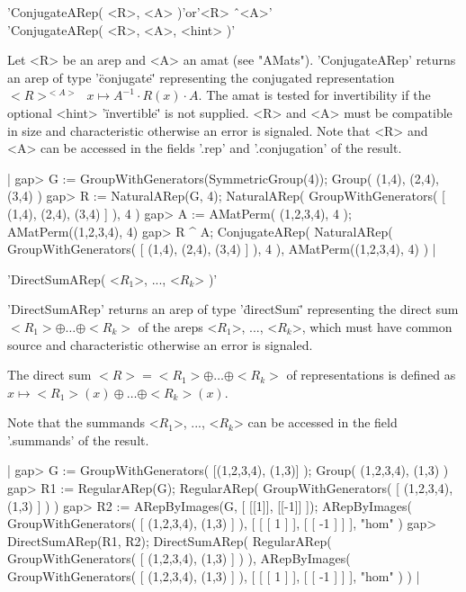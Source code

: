 
'ConjugateARep( <R>, <A> )'\quad or\quad '<R> \^\ <A>'\\
'ConjugateARep( <R>, <A>, <hint> )'

Let <R> be an arep and <A> an amat (see "AMats"). 
'ConjugateARep' returns an arep of type '\"conjugate\"' 
representing the conjugated representation 
$<R>^{<A>}\:\ x\mapsto A^{-1}\cdot R(x)\cdot A$. The amat
is tested for invertibility if the optional <hint> 
'\"invertible\"' is not supplied. <R> and <A> must be compatible 
in size and characteristic otherwise an error is signaled.
Note that <R> and <A> can be accessed in the fields '.rep'
and '.conjugation' of the result.

|    gap> G := GroupWithGenerators(SymmetricGroup(4));
    Group( (1,4), (2,4), (3,4) )
    gap> R := NaturalARep(G, 4);
    NaturalARep( GroupWithGenerators( [ (1,4), (2,4), (3,4) ] ), 4 )
    gap> A := AMatPerm( (1,2,3,4), 4 );
    AMatPerm((1,2,3,4), 4)
    gap> R ^ A;
    ConjugateARep(
      NaturalARep( GroupWithGenerators( [ (1,4), (2,4), (3,4) ] ), 4 ),
      AMatPerm((1,2,3,4), 4)
    ) |


'DirectSumARep( <$R_1$>, ..., <$R_k$> )'

'DirectSumARep' returns an arep of type '\"directSum\"' 
representing the direct sum $<R_1>\oplus\dots\oplus <R_k>$ 
of the areps <$R_1$>, ..., <$R_k$>, 
which must have common source and characteristic otherwise an error is
signaled. 

The direct sum $<R> = <R_1>\oplus\dots\oplus <R_k>$ 
of representations is defined as 
$x\mapsto <R_1>(x)\oplus\dots\oplus <R_k>(x)$.

Note that the summands <$R_1$>, ..., <$R_k$> can be accessed 
in the field '.summands' of the result.

|    gap> G := GroupWithGenerators( [(1,2,3,4), (1,3)] );
    Group( (1,2,3,4), (1,3) )
    gap> R1 := RegularARep(G);
    RegularARep( GroupWithGenerators( [ (1,2,3,4), (1,3) ] ) )
    gap> R2 := ARepByImages(G, [ [[1]], [[-1]] ]);
    ARepByImages(
      GroupWithGenerators( [ (1,2,3,4), (1,3) ] ),
      [ [ [ 1 ] ], [ [ -1 ] ] ],
      "hom"
    )
    gap> DirectSumARep(R1, R2);
    DirectSumARep(
      RegularARep( GroupWithGenerators( [ (1,2,3,4), (1,3) ] ) ),
      ARepByImages(
        GroupWithGenerators( [ (1,2,3,4), (1,3) ] ),
        [ [ [ 1 ] ], [ [ -1 ] ] ],
        "hom"
      )
    ) |

